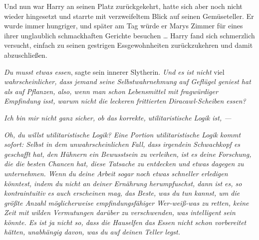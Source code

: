 Und nun war Harry an seinen Platz zurückgekehrt, hatte sich aber noch nicht wieder hingesetzt und starrte mit verzweifeltem Blick auf seinen Gemüseteller. Er wurde immer hungriger, und später am Tag würde er Marys Zimmer für eines ihrer unglaublich schmackhaften Gerichte besuchen … Harry fand sich schmerzlich versucht, einfach zu seinen gestrigen Essgewohnheiten zurückzukehren und damit abzuschließen.

\emph{Du musst etwas essen}, sagte sein innerer Slytherin. \emph{Und es ist nicht} viel \emph{wahrscheinlicher, dass jemand seine Selbstwahrnehmung auf Geflügel geniest hat als auf Pflanzen, also, wenn man schon Lebensmittel mit fragwürdiger Empfindung isst, warum nicht die leckeren frittierten} \emph{Diracawl-Scheiben essen?}

\emph{Ich bin mir nicht ganz sicher, ob das korrekte, utilitaristische Logik ist, —}

\emph{Oh, du willst utilitaristische Logik? Eine Portion utilitaristische Logik kommt sofort: Selbst in dem unwahrscheinlichen Fall, dass irgendein Schwachkopf es geschafft hat, den Hühnern ein Bewusstsein zu verleihen, ist es deine Forschung, die die besten Chancen hat, diese Tatsache zu entdecken und etwas dagegen zu unternehmen. Wenn du deine Arbeit sogar noch etwas schneller erledigen könntest, indem du \emph{nicht} an deiner Ernährung herumpfuschst, dann ist es, so kontraintuitiv es auch erscheinen mag, das Beste, was du tun kannst, um die größte Anzahl möglicherweise empfindungsfähiger Wer-weiß-was zu retten, keine Zeit mit wilden Vermutungen darüber zu verschwenden, was intelligent sein könnte. Es ist ja nicht so, dass die Hauselfen das Essen nicht schon vorbereitet hätten, unabhängig davon, was du auf deinen Teller legst.}

